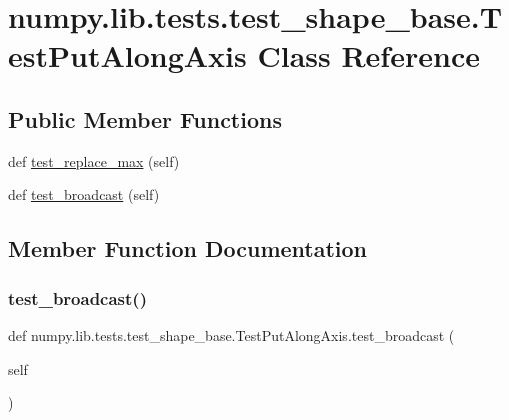 \hypertarget{classnumpy_1_1lib_1_1tests_1_1test__shape__base_1_1TestPutAlongAxis}{}\section{numpy.\+lib.\+tests.\+test\+\_\+shape\+\_\+base.\+Test\+Put\+Along\+Axis Class Reference}
\label{classnumpy_1_1lib_1_1tests_1_1test__shape__base_1_1TestPutAlongAxis}
\subsection*{Public Member Functions}
\begin{DoxyCompactItemize}
\item 
def \hyperlink{classnumpy_1_1lib_1_1tests_1_1test__shape__base_1_1TestPutAlongAxis_accfb59a725b9f96449f4fdb3ce728d92}{test\+\_\+replace\+\_\+max} (self)
\item 
def \hyperlink{classnumpy_1_1lib_1_1tests_1_1test__shape__base_1_1TestPutAlongAxis_a460802fca0e19c6b8735c510c1ad6154}{test\+\_\+broadcast} (self)
\end{DoxyCompactItemize}


\subsection{Member Function Documentation}
\mbox{\label{classnumpy_1_1lib_1_1tests_1_1test__shape__base_1_1TestPutAlongAxis_a460802fca0e19c6b8735c510c1ad6154}} 
\subsubsection{\texorpdfstring{test\+\_\+broadcast()}{test\_broadcast()}}
{\footnotesize\ttfamily def numpy.\+lib.\+tests.\+test\+\_\+shape\+\_\+base.\+Test\+Put\+Along\+Axis.\+test\+\_\+broadcast (\begin{DoxyParamCaption}\item[{}]{self }\end{DoxyParamCaption})}

